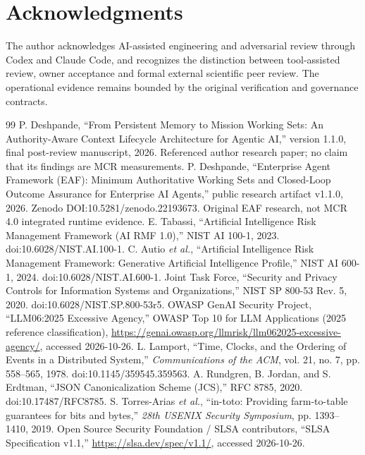 \documentclass[11pt,twocolumn]{article}
\begin{document}
\section*{Acknowledgments}
The author acknowledges AI-assisted engineering and adversarial review through Codex and Claude Code, and recognizes the distinction between tool-assisted review, owner acceptance and formal external scientific peer review. The operational evidence remains bounded by the original verification and governance contracts.

\begin{thebibliography}{99}\setlength{\itemsep}{1pt}\footnotesize
{} P. Deshpande, ``From Persistent Memory to Mission Working Sets: An Authority-Aware Context Lifecycle Architecture for Agentic AI,'' version 1.1.0, final post-review manuscript, 2026. Referenced author research paper; no claim that its findings are MCR measurements.
 P. Deshpande, ``Enterprise Agent Framework (EAF): Minimum Authoritative Working Sets and Closed-Loop Outcome Assurance for Enterprise AI Agents,'' public research artifact v1.1.0, 2026. Zenodo DOI:10.5281/zenodo.22193673. Original EAF research, not MCR 4.0 integrated runtime evidence.
 E. Tabassi, ``Artificial Intelligence Risk Management Framework (AI RMF 1.0),'' NIST AI 100-1, 2023. doi:10.6028/NIST.AI.100-1.
 C. Autio \emph{et al.}, ``Artificial Intelligence Risk Management Framework: Generative Artificial Intelligence Profile,'' NIST AI 600-1, 2024. doi:10.6028/NIST.AI.600-1.
 Joint Task Force, ``Security and Privacy Controls for Information Systems and Organizations,'' NIST SP 800-53 Rev. 5, 2020. doi:10.6028/NIST.SP.800-53r5.
 OWASP GenAI Security Project, ``LLM06:2025 Excessive Agency,'' OWASP Top 10 for LLM Applications (2025 reference classification), \url{https://genai.owasp.org/llmrisk/llm062025-excessive-agency/}, accessed 2026-10-26.
 L. Lamport, ``Time, Clocks, and the Ordering of Events in a Distributed System,'' \emph{Communications of the ACM}, vol. 21, no. 7, pp. 558--565, 1978. doi:10.1145/359545.359563.
 A. Rundgren, B. Jordan, and S. Erdtman, ``JSON Canonicalization Scheme (JCS),'' RFC 8785, 2020. doi:10.17487/RFC8785.
 S. Torres-Arias \emph{et al.}, ``in-toto: Providing farm-to-table guarantees for bits and bytes,'' \emph{28th USENIX Security Symposium}, pp. 1393--1410, 2019.
 Open Source Security Foundation / SLSA contributors, ``SLSA Specification v1.1,'' \url{https://slsa.dev/spec/v1.1/}, accessed 2026-10-26.

\end{thebibliography}
\end{document}
